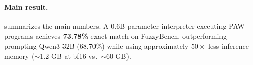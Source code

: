 \documentclass{article}
\theoremstyle{plain}
\theoremstyle{definition}
\theoremstyle{remark}
\begin{document}
\paragraph{Main result.}
 summarizes the main numbers. A 0.6B-parameter interpreter executing PAW programs achieves \textbf{73.78\%} exact match on FuzzyBench, outperforming prompting Qwen3-32B (68.70\%) while using approximately $50\times$ less inference memory ($\sim$1.2 GB at bf16 vs.\ $\sim$60 GB). %
\end{document}
